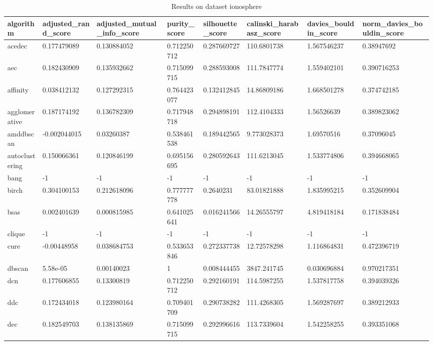 \clearpage

\begin{table}[H]
\centering
\caption{Results on dataset ionosphere}
\label{S64_Table}
\begin{tabular}{|l|l|l|l|l|l|l|l|}
\hline
algorithm & adjusted\_rand\_score & adjusted\_mutual\_info\_score & purity\_score & silhouette\_score & calinski\_harabasz\_score & davies\_bouldin\_score & norm\_davies\_bouldin\_score \\
\hline
acedec & 0.177479089 & 0.130884052 & 0.712250712 & 0.287669727 & 110.6801738 & 1.567546237 & 0.38947692 \\
\hline
aec & 0.182430909 & 0.135932662 & 0.715099715 & 0.288593008 & 111.7847774 & 1.559402101 & 0.390716253 \\
\hline
affinity & 0.038412132 & 0.127292315 & 0.764423077 & 0.132412845 & 14.86809186 & 1.668501278 & 0.374742185 \\
\hline
agglomerative & 0.187174192 & 0.136782309 & 0.717948718 & 0.294898191 & 112.4104333 & 1.56526639 & 0.389823062 \\
\hline
amddbscan & -0.002044015 & 0.03260387 & 0.538461538 & 0.189442565 & 9.773028373 & 1.69570516 & 0.37096045 \\
\hline
autoclustering & 0.150066361 & 0.120846199 & 0.695156695 & 0.280592643 & 111.6213045 & 1.533774806 & 0.394668065 \\
\hline
bang & -1 & -1 & -1 & -1 & -1 & -1 & -1 \\
\hline
birch & 0.304100153 & 0.212618096 & 0.777777778 & 0.2640231 & 83.01821888 & 1.835995215 & 0.352609904 \\
\hline
bsas & 0.002401639 & 0.000815985 & 0.641025641 & 0.016241566 & 14.26555797 & 4.819418184 & 0.171838484 \\
\hline
clique & -1 & -1 & -1 & -1 & -1 & -1 & -1 \\
\hline
cure & -0.00448958 & 0.038684753 & 0.533653846 & 0.272337738 & 12.72578298 & 1.116864831 & 0.472396719 \\
\hline
dbscan & 5.58e-05 & 0.00140023 & 1 & 0.008444455 & 3847.241745 & 0.030696884 & 0.970217351 \\
\hline
dcn & 0.177606855 & 0.13300819 & 0.712250712 & 0.292160191 & 114.5987255 & 1.537817758 & 0.394039326 \\
\hline
ddc & 0.172434018 & 0.123980164 & 0.709401709 & 0.290738282 & 111.4268305 & 1.569287697 & 0.389212933 \\
\hline
dec & 0.182549703 & 0.138135869 & 0.715099715 & 0.292996616 & 113.7339604 & 1.542258255 & 0.393351068 \\

\end{tabular}
\end{table}
